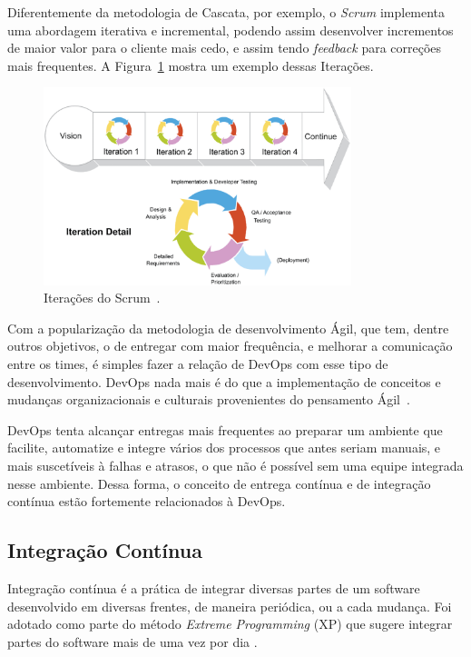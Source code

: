 Diferentemente da metodologia de Cascata, por exemplo, o \textit{Scrum} implementa uma
abordagem iterativa e incremental, podendo assim desenvolver incrementos de
maior valor para o cliente mais cedo, e assim tendo \textit{feedback} para correções
mais frequentes. A Figura~\ref{fig:iterativ} mostra um exemplo dessas
Iterações.~\cite{scrumreference:2016}

\begin{figure}[]
  \centering
  \includegraphics[width=0.8\textwidth]{figuras/iterative.eps}
  \caption{Iterações do Scrum~\cite{scrumreference:2016}.}
  \label{fig:iterativ}
\end{figure}

Com a popularização da metodologia de desenvolvimento Ágil, que tem, dentre outros
objetivos, o de entregar com maior frequência, e melhorar a comunicação entre os
times, é simples fazer a relação de DevOps com esse tipo de desenvolvimento.
DevOps nada mais é do que a implementação de conceitos e mudanças organizacionais
e culturais provenientes do pensamento Ágil~\cite{scott2014}.

DevOps tenta alcançar entregas mais frequentes ao preparar um ambiente que facilite,
automatize e integre vários dos processos que antes seriam manuais, e mais
suscetíveis à falhas e atrasos, o que não é possível sem uma equipe integrada
nesse ambiente. Dessa forma, o conceito de entrega contínua e de integração
contínua estão fortemente relacionados à DevOps.~\cite{adambertram:2016}

\subsection{Integração Contínua}

Integração contínua é a prática de integrar diversas partes de um software
desenvolvido em diversas frentes, de maneira periódica, ou a cada mudança.
Foi adotado como parte do método \textit{Extreme Programming} (XP) que sugere integrar
partes do software mais de uma vez por dia \cite{fowler2006continuous}.

